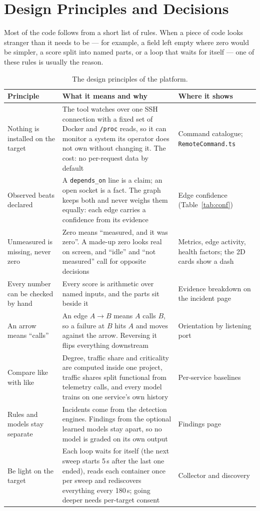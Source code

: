 \section{Design Principles and Decisions}
\label{sec:principles}
Most of the code follows from a short list of rules. When a piece of code looks stranger than it needs to be — for example, a field left empty where zero would be simpler, a score split into named parts, or a loop that waits for itself — one of these rules is usually the reason.

\begin{table}[!htbp]
\centering
\caption{The design principles of the platform.}
\label{tab:principles}
\small
\renewcommand{\arraystretch}{1.2}
\begin{tabularx}{\textwidth}{>{\raggedright\arraybackslash}p{4.0cm}>{\raggedright\arraybackslash}X>{\raggedright\arraybackslash}p{3.6cm}}
\toprule
\textbf{Principle} & \textbf{What it means and why} & \textbf{Where it shows}\\
\midrule
Nothing is installed on the target & The tool watches over one SSH connection with a fixed set of Docker and \texttt{/proc} reads, so it can monitor a system its operator does not own without changing it. The cost: no per-request data by default & Command catalogue; \texttt{RemoteCommand.ts}\\
Observed beats declared & A \texttt{depends\_on} line is a claim; an open socket is a fact. The graph keeps both and never weighs them equally: each edge carries a confidence from its evidence & Edge confidence (Table~\ref{tab:conf})\\
Unmeasured is missing, never zero & Zero means ``measured, and it was zero''. A made-up zero looks real on screen, and ``idle'' and ``not measured'' call for opposite decisions & Metrics, edge activity, health factors; the 2D cards show a dash\\
Every number can be checked by hand & Every score is arithmetic over named inputs, and the parts sit beside it & Evidence breakdown on the incident page\\
An arrow means ``calls'' & An edge $A \to B$ means $A$ calls $B$, so a failure at $B$ hits $A$ and moves against the arrow. Reversing it flips everything downstream & Orientation by listening port\\
Compare like with like & Degree, traffic share and criticality are computed inside one project, traffic shares split functional from telemetry calls, and every model trains on one service's own history & Per-service baselines\\
Rules and models stay separate & Incidents come from the detection engines. Findings from the optional learned models stay apart, so no model is graded on its own output & Findings page\\
Be light on the target & Each loop waits for itself (the next sweep starts 5\,s after the last one ended), reads each container once per sweep and rediscovers everything every 180\,s; going deeper needs per-target consent & Collector and discovery\\
\bottomrule
\end{tabularx}
\end{table}

